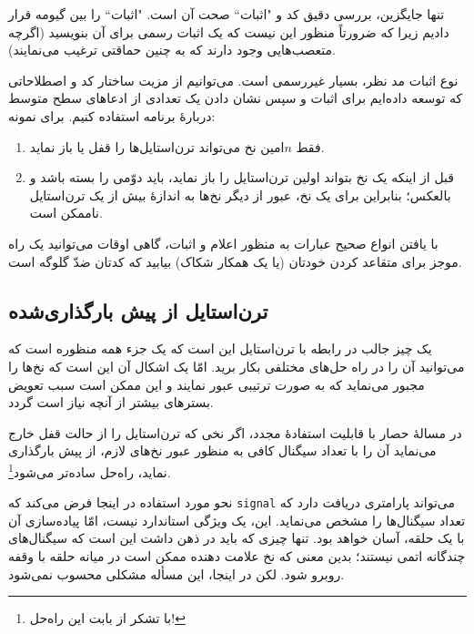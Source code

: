 \documentclass{book}
\newcommand{\clearemptydoublepage}{\newpage\cleardoublepage}
\begin{document}
    تنها جایگزین، بررسی دقیق کد و "اثبات`` صحت آن است. "اثبات`` را بین گیومه قرار دادیم زیرا که ضرورتاً منظور این نیست که یک اثبات 
    رسمی برای آن بنویسید (اگرچه متعصب‌هایی وجود دارند که به چنین حماقتی  ترغیب می‌نمایند).

نوع اثبات مد نظر، بسیار غیررسمی است. می‌توانیم از مزیت ساختار کد و اصطلاحاتی که توسعه داده‌ایم برای اثبات و سپس نشان دادن 
یک تعدادی از ادعاهای سطح متوسط دربارهٔ برنامه استفاده کنیم. برای نمونه:


    
\begin{enumerate}

\item 
    فقط $n$امین نخ می‌تواند ترن‌استایل‌ها را قفل یا باز نماید. 

\item 
    قبل از اینکه یک نخ بتواند اولین ترن‌استایل را باز نماید، باید دوّمی را بسته باشد و بالعکس؛‌ بنابراین برای یک نخ، عبور از دیگر نخ‌ها به اندازهٔ بیش از 
    یک تر‌ن‌استایل ناممکن است. 

\end{enumerate}

    با یافتن انواع صحیح عبارات به منظور اعلام و اثبات، گاهی اوقات می‌توانید یک راه موجز برای متقاعد کردن خودتان  (یا یک همکار 
    شکاک) بیابید که کدتان ضدّ  گلوگه است. 
    

\clearemptydoublepage
\subsection { ترن‌استایل از پیش بارگذاری‌شده}

    یک چیز جالب در رابطه با ترن‌استایل این است که یک جزء همه منظوره است که می‌توانید آن را در راه حل‌های مختلفی بکار برید. 
    امّا یک اشکال آن این است که نخ‌ها را مجبور می‌نماید که به صورت ترتیبی عبور نمایند و این ممکن است سبب 
    تعویض بسترهای بیشتر از آنچه نیاز است گردد.

    در مسالهٔ حصار با قابلیت استفادهٔ مجدد، اگر نخی که ترن‌استایل را از حالت قفل خارج می‌نماید 
    آن را با تعداد سیگنال کافی به منظور عبور نخ‌های لازم، از پیش بارگذاری نماید، راه‌حل ساده‌تر می‌شود\footnote{با تشکر از  بابت این راه‌حل!}. 

    نحو مورد استفاده در اینجا فرض می‌کند که \texttt{signal} می‌تواند پارامتری دریافت دارد که تعداد سیگنال‌ها را مشخص می‌نماید. 
    این، یک ویژگی استاندارد نیست، امّا پیاده‌سازی آن با یک حلقه، آسان خواهد بود. تنها چیزی که باید در ذهن داشت این است که سیگنال‌های چندگانه 
    اتمی نیستند؛ بدین معنی که نخ علامت دهنده ممکن است در میانه حلقه با وقفه روبرو شود. لکن در اینجا، این مسأله مشکلی محسوب نمی‌شود.
\end{document}
